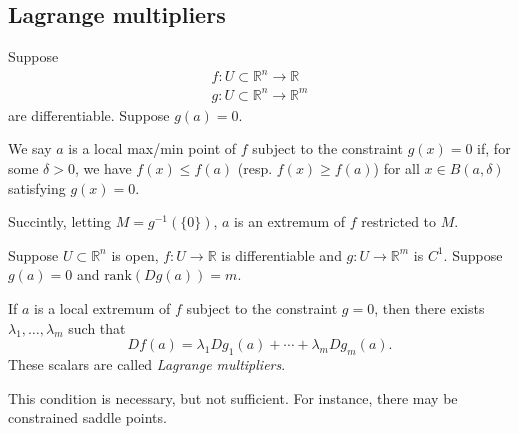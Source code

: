 \documentclass[12pt]{article}
\begin{document}

\subsection{Lagrange multipliers} %

\begin{definition}
	Suppose 
	\begin{gather*}
		f: U\subset\mathbb{R}^n \to \mathbb{R} \\
		g: U\subset\mathbb{R}^n \to \mathbb{R}^m 
	\end{gather*}
	are differentiable. Suppose $g(a)=0$.

	We say $a$ is a local max/min point of $f$ subject to the constraint $g(x)=0$ if, for some $\delta>0$, we have $f(x)\leq f(a)$ (resp. $f(x)\geq f(a)$) for all $x\in B(a,\delta)$ satisfying $g(x)=0$.

	Succintly, letting $M=g^{-1}(\{0\})$, $a$ is an extremum of $f$ restricted to $M$.
\end{definition}

\begin{theorem}
	Suppose $U\subset\mathbb{R}^n$ is open, $f:U\to\mathbb{R}$ is differentiable and $g:U\to\mathbb{R}^m$ is $C^1$. Suppose $g(a)=0$ and $\text{rank}(Dg(a))=m$.

	If $a$ is a local extremum of $f$ subject to the constraint $g=0$, then there exists $\lambda_1,\dots,\lambda_m$ such that 
	\begin{equation*}
		Df(a) = \lambda_1Dg_1(a) + \cdots + \lambda_m Dg_m(a).
	\end{equation*}
	These scalars are called \emph{Lagrange multipliers}.
\end{theorem}

\begin{remark}
	This condition is necessary, but not sufficient. For instance, there may be constrained saddle points.
\end{remark}
\end{document}
